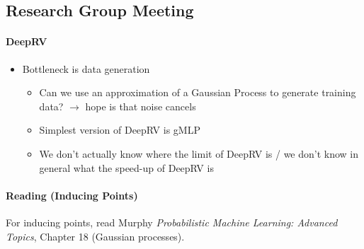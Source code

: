 \documentclass[12pt,a4paper,twoside]{article}
\begin{document}
\subsection{Research Group Meeting}
\begin{meetingsummary}

	\paragraph{DeepRV}
	\begin{itemize}
	\item Bottleneck is data generation
	\begin{itemize}
		\item Can we use an approximation of a Gaussian Process to generate training data? $\rightarrow$ hope is that noise cancels
		\item Simplest version of DeepRV is gMLP
		\item We don’t actually know where the limit of DeepRV is / we don’t know in general what the speed-up of DeepRV is
	\end{itemize}
	\end{itemize}

	\paragraph{Reading (Inducing Points)}
	For inducing points, read Murphy \emph{Probabilistic Machine Learning: Advanced Topics}, Chapter 18 (Gaussian processes).


\end{meetingsummary}
\end{document}
